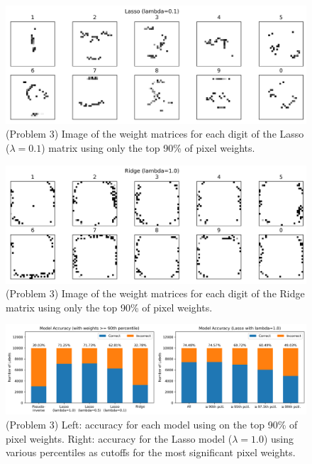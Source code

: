 \documentclass[10pt]{article}
\begin{document}
\begin{figure}[ht]
\centerline{\includegraphics[scale=0.75]{figures/weight_matrix_lasso_01_geq_90th_no_zeros.png}}
\caption{(Problem 3) Image of the weight matrices for each digit of the Lasso ($\lambda=0.1$)  matrix using only the top 90\% of pixel weights.}
\label{fig18}
\end{figure}

\begin{figure}[ht]
\centerline{\includegraphics[scale=0.75]{figures/weight_matrix_ridge_geq_90th_no_zeros.png}}
\caption{(Problem 3) Image of the weight matrices for each digit of the Ridge matrix using only the top 90\% of pixel weights.}
\label{fig19}
\end{figure}

\begin{figure}[ht]
\centerline{\includegraphics[scale=0.6]{figures/most_important_pixels_90th_accuracy.png}}
\caption{(Problem 3) Left: accuracy for each model using on the top 90\% of pixel weights. Right: accuracy for the Lasso model ($\lambda=1.0$) using various percentiles as cutoffs for the most significant pixel weights.}
\label{fig20}
\end{figure}
\end{document}
